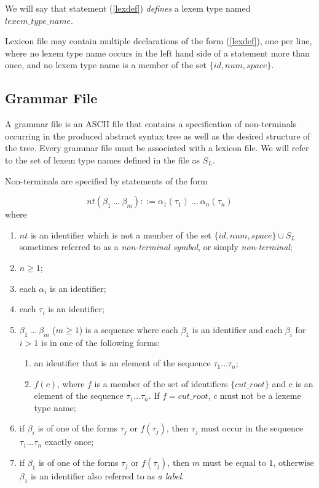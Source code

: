 \documentclass[a4paper,10pt]{article}
\begin{document}
We will say that statement (\ref{lexdef}) \textit{defines} a lexem type named $lexem\_type\_name$.

Lexicon file may contain multiple declarations of the form (\ref{lexdef}), one per line, where no lexem type name occurs in the left hand side of a statement more than once, and no lexem type name is a member of the set $\{id, num, space\}  $.

 
\subsection{Grammar File}\label{gf}
A grammar file is an ASCII file that contains a specification of non-terminals occurring in the produced abstract syntax tree as well as the desired structure of the tree. Every grammar file must be associated with a lexicon file. We will refer to the set of lexem type names defined in the file as $S_L$.  


Non-terminals are specified  by  statements of the form 

\begin{equation}\label{nontd}
nt(\beta_1~\ldots~\beta_m) ::= \alpha_1(\tau_1)~\ldots~\alpha_n(\tau_n) 
\end{equation}
where 
\begin{enumerate}
\item $nt$ is an identifier which is not a member of the set $\{id, num, space\}\cup S_L$ sometimes referred to as a \textit{non-terminal symbol}, or simply \textit{non-terminal};
\item $n\ge 1$;
\item each $\alpha_i$  is an identifier;
\item each $\tau_i$ is an identifier;
\item $\beta_1~\ldots~\beta_m$ ($m \ge 1$) is a sequence  where
 each  $\beta_1$  is an identifier and each $\beta_i$ for $i>1$ 
is in one of the following forms:
\begin{enumerate}
\item an identifier that is an element of the sequence   $\tau_1\ldots \tau_n$;
\item $f(c)$, where $f$ is a member of the set of identifiers $\{cut\_root\}$ and c is an element of  the sequence   $\tau_1\ldots \tau_n$.
If $f = cut\_root$, $c$ must not be a lexeme type name;
\end{enumerate} 
\item  if $\beta_i$ is of one of the forms $\tau_j$ or $f(\tau_j)$, then  $\tau_j$ must occur in the sequence  $\tau_1\ldots \tau_n$ exactly once;
\item if $\beta_1$ is of one of the forms $\tau_j$ or $f(\tau_j)$, then $m$ must be equal to $1$, otherwise $\beta_1$ is an identifier also referred to as \textit{a label}.
\end{enumerate}
\end{document}
